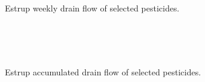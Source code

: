 \begin{figure}[htbp]
  \begin{center}
    \\
    \\
    \\
  \end{center}
  \caption{Estrup weekly drain flow of selected pesticides.}
  \label{fig:Estrup-weekly}
\end{figure}

\begin{figure}[htbp]
  \begin{center}
    \\
    \\
    \\
  \end{center}
  \caption{Estrup accumulated drain flow of selected pesticides.}
  \label{fig:Estrup-acc}
\end{figure}


